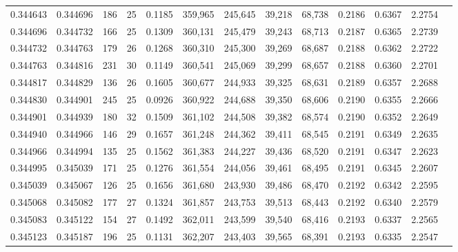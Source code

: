 \begin{tabular}{rrrrrrrrrrrrr}
0.344643 & 0.344696 &   186 &  25 &                                     0.1185 & 359,965 & 245,645 &  39,218 &  68,738 & 0.2186 & 0.6367 & 2.2754 \\
0.344696 & 0.344732 &   166 &  25 &                                     0.1309 & 360,131 & 245,479 &  39,243 &  68,713 & 0.2187 & 0.6365 & 2.2739 \\
0.344732 & 0.344763 &   179 &  26 &                                     0.1268 & 360,310 & 245,300 &  39,269 &  68,687 & 0.2188 & 0.6362 & 2.2722 \\
0.344763 & 0.344816 &   231 &  30 &                                     0.1149 & 360,541 & 245,069 &  39,299 &  68,657 & 0.2188 & 0.6360 & 2.2701 \\
0.344817 & 0.344829 &   136 &  26 &                                     0.1605 & 360,677 & 244,933 &  39,325 &  68,631 & 0.2189 & 0.6357 & 2.2688 \\
0.344830 & 0.344901 &   245 &  25 &                                     0.0926 & 360,922 & 244,688 &  39,350 &  68,606 & 0.2190 & 0.6355 & 2.2666 \\
0.344901 & 0.344939 &   180 &  32 &                                     0.1509 & 361,102 & 244,508 &  39,382 &  68,574 & 0.2190 & 0.6352 & 2.2649 \\
0.344940 & 0.344966 &   146 &  29 &                                     0.1657 & 361,248 & 244,362 &  39,411 &  68,545 & 0.2191 & 0.6349 & 2.2635 \\
0.344966 & 0.344994 &   135 &  25 &                                     0.1562 & 361,383 & 244,227 &  39,436 &  68,520 & 0.2191 & 0.6347 & 2.2623 \\
0.344995 & 0.345039 &   171 &  25 &                                     0.1276 & 361,554 & 244,056 &  39,461 &  68,495 & 0.2191 & 0.6345 & 2.2607 \\
0.345039 & 0.345067 &   126 &  25 &                                     0.1656 & 361,680 & 243,930 &  39,486 &  68,470 & 0.2192 & 0.6342 & 2.2595 \\
0.345068 & 0.345082 &   177 &  27 &                                     0.1324 & 361,857 & 243,753 &  39,513 &  68,443 & 0.2192 & 0.6340 & 2.2579 \\
0.345083 & 0.345122 &   154 &  27 &                                     0.1492 & 362,011 & 243,599 &  39,540 &  68,416 & 0.2193 & 0.6337 & 2.2565 \\
0.345123 & 0.345187 &   196 &  25 &                                     0.1131 & 362,207 & 243,403 &  39,565 &  68,391 & 0.2193 & 0.6335 & 2.2547 \\

\end{tabular}
